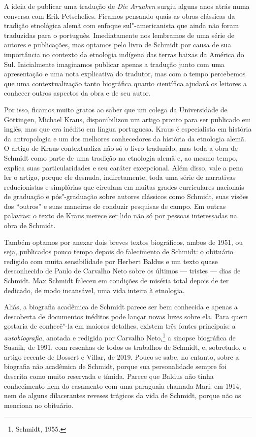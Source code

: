 A ideia de publicar uma tradução de \textit{Die Aruaken} surgiu alguns
anos atrás numa conversa com Erik Petschelies. Ficamos pensando quais as
obras clássicas da tradição etnológica alemã com enfoque sul"-americanista
que ainda não foram traduzidas para o português. Imediatamente nos
lembramos de uma série de autores e publicações, mas optamos pelo livro
de Schmidt por causa de sua importância no contexto da etnologia
indígena das terras baixas da América do Sul. Inicialmente imaginamos
publicar apenas a tradução junto com uma apresentação e uma nota
explicativa do tradutor, mas com o tempo percebemos que uma
contextualização tanto biográfica quanto científica ajudará os leitores
a conhecer outros aspectos da obra e de seu autor.

Por isso, ficamos muito gratos ao saber que um colega da Universidade de
Göttingen, Michael Kraus, disponibilizou um artigo pronto para ser
publicado em inglês, mas que era inédito em língua portuguesa. Kraus é
especialista em história da antropologia e um dos melhores conhecedores
da história da etnologia alemã. O artigo de Kraus contextualiza não só o
livro traduzido, mas toda a obra de Schmidt como parte de uma tradição
na etnologia alemã e, ao mesmo tempo, explica suas particularidades e
seu caráter excepcional. Além disso, vale a pena ler o artigo, porque
ele desnuda, indiretamente, toda uma série de narrativas reducionistas e
simplórias que circulam em muitas grades curriculares nacionais de
graduação e pós"-graduação sobre autores clássicos como Schmidt, suas
visões dos ``outros'' e suas maneiras de conduzir pesquisas de campo. Em
outras palavras: o texto de Kraus merece ser lido não só por pessoas
interessadas na obra de Schmidt.

Também optamos por anexar dois breves textos biográficos, ambos de
1951, ou seja, publicados pouco tempo depois do falecimento de Schmidt:
o obituário redigido com muita sensibilidade por Herbert Baldus e um
texto quase desconhecido de Paulo de Carvalho Neto sobre os últimos ---
tristes --- dias de Schmidt. Max Schmidt faleceu em condições de miséria
total depois de ter dedicado, de modo incansável, uma vida inteira à
etnologia.

Aliás, a biografia acadêmica de Schmidt parece ser bem conhecida e
apenas a descoberta de documentos inéditos pode lançar novas luzes sobre
ela. Para quem gostaria de conhecê"-la em maiores detalhes, existem três
fontes principais: a \textit{autobiografia}, anotada e redigida por Carvalho
Neto,\footnote{Schmidt, 1955.} a sinopse biográfica de Susnik, de 1991, com
resenhas de todos os trabalhos de Schmidt, e, sobretudo, o artigo
recente de Bossert e Villar, de 2019. Pouco se sabe, no entanto, sobre a
biografia não acadêmica de Schmidt, porque sua personalidade sempre foi
descrita como muito reservada e tímida. Parece que Baldus não tinha
conhecimento nem do casamento com uma paraguaia chamada Mari, em 1914,
nem de alguns dilacerantes reveses trágicos da vida de Schmidt, porque
não os menciona no obituário.

